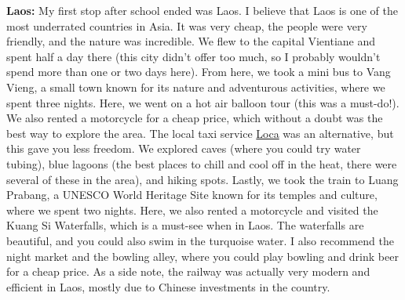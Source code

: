 \textbf{Laos:} My first stop after school ended was Laos. I believe that Laos is one of the most underrated countries in Asia. It was very cheap, the people were very friendly, and the nature was incredible. We flew to the capital Vientiane and spent half a day there (this city didn't offer too much, so I probably wouldn't spend more than one or two days here). From here, we took a mini bus to Vang Vieng, a small town known for its nature and adventurous activities, where we spent three nights. Here, we went on a hot air balloon tour (this was a must-do!). We also rented a motorcycle for a cheap price, which without a doubt was the best way to explore the area. The local taxi service \href{https://www.google.com/url?sa=t&source=web&rct=j&opi=89978449&url=https://apps.apple.com/us/app/loca-laos-e-mobility-payment/id1374380531&ved=2ahUKEwiT9L-zvJaOAxVMKBAIHf7-CVoQFnoECBcQAQ&usg=AOvVaw16TeN9fX6dDoffHbK5roM6}{Loca} was an alternative, but this gave you less freedom. We explored caves (where you could try water tubing), blue lagoons (the best places to chill and cool off in the heat, there were several of these in the area), and hiking spots. Lastly, we took the train to Luang Prabang, a UNESCO World Heritage Site known for its temples and culture, where we spent two nights. Here, we also rented a motorcycle and visited the Kuang Si Waterfalls, which is a must-see when in Laos. The waterfalls are beautiful, and you could also swim in the turquoise water. I also recommend the night market and the bowling alley, where you could play bowling and drink beer for a cheap price. As a side note, the railway was actually very modern and efficient in Laos, mostly due to Chinese investments in the country.

